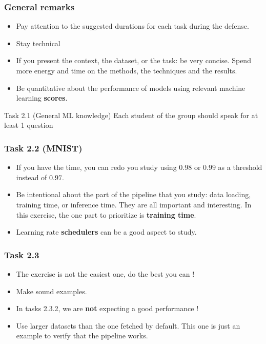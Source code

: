 \documentclass[usenames,dvipsnames,french]{beamer}
\begin{document}
\frame{\titlepage}

\begin{frame}
    \frametitle{General remarks}

    \begin{itemize}
        \item Pay attention to the suggested durations for each task during the defense.
        
        \item Stay technical
        
        \item If you present the context, the dataset, or the task: be very concise. Spend more energy and time on the methods, the techniques and the results.
        
        \item Be quantitative about the performance of models using relevant machine learning \textbf{scores}.
    \end{itemize}
\end{frame}

\begin{frame}{Task 2.1 (General ML knowledge)}
    Each student of the group should speak for at least 1 question
\end{frame}

\begin{frame}
    \frametitle{Task 2.2 (MNIST)}
    \begin{itemize}
        \item If you have the time, you can redo you study using $0.98$ or $0.99$ as a threshold instead of $0.97$.
        
        \item Be intentional about the part of the pipeline that you study: data loading, training time, or inference time. They are all important and interesting. In this exercise, the one part to prioritize is \textbf{training time}.
        
        \item Learning rate \textbf{schedulers} can be a good aspect to study.
    \end{itemize}
\end{frame}

\begin{frame}
    \frametitle{Task 2.3}
    \begin{itemize}
        \item The exercise is not the easiest one, do the best you can !
        
        \item Make sound examples.
        
        \item In tasks 2.3.2, we are \textbf{not} expecting a good performance !

        
        \item Use larger datasets than the one fetched by default. This one is just an example to verify that the pipeline works.
    \end{itemize}
\end{frame}
\end{document}

